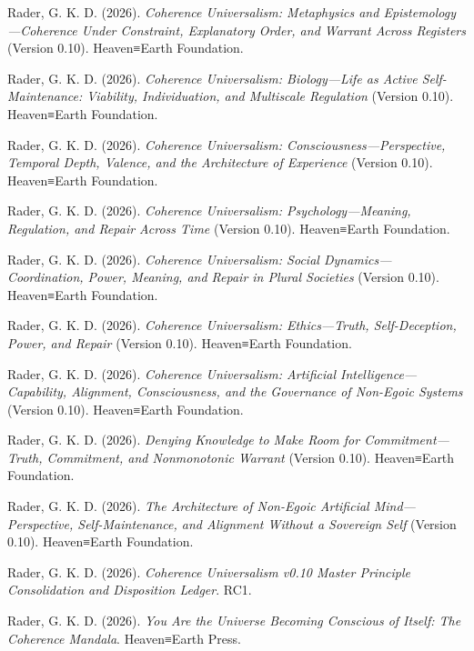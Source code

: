 \documentclass[
  11pt,
]{article}
\begin{document}
Rader, G. K. D. (2026). \emph{Coherence Universalism: Metaphysics and
Epistemology---Coherence Under Constraint, Explanatory Order, and
Warrant Across Registers} (Version 0.10). Heaven≡Earth Foundation.

Rader, G. K. D. (2026). \emph{Coherence Universalism: Biology---Life as
Active Self-Maintenance: Viability, Individuation, and Multiscale
Regulation} (Version 0.10). Heaven≡Earth Foundation.

Rader, G. K. D. (2026). \emph{Coherence Universalism:
Consciousness---Perspective, Temporal Depth, Valence, and the
Architecture of Experience} (Version 0.10). Heaven≡Earth Foundation.

Rader, G. K. D. (2026). \emph{Coherence Universalism:
Psychology---Meaning, Regulation, and Repair Across Time} (Version
0.10). Heaven≡Earth Foundation.

Rader, G. K. D. (2026). \emph{Coherence Universalism: Social
Dynamics---Coordination, Power, Meaning, and Repair in Plural Societies}
(Version 0.10). Heaven≡Earth Foundation.

Rader, G. K. D. (2026). \emph{Coherence Universalism: Ethics---Truth,
Self-Deception, Power, and Repair} (Version 0.10). Heaven≡Earth
Foundation.

Rader, G. K. D. (2026). \emph{Coherence Universalism: Artificial
Intelligence---Capability, Alignment, Consciousness, and the Governance
of Non-Egoic Systems} (Version 0.10). Heaven≡Earth Foundation.

Rader, G. K. D. (2026). \emph{Denying Knowledge to Make Room for
Commitment---Truth, Commitment, and Nonmonotonic Warrant} (Version
0.10). Heaven≡Earth Foundation.

Rader, G. K. D. (2026). \emph{The Architecture of Non-Egoic Artificial
Mind---Perspective, Self-Maintenance, and Alignment Without a Sovereign
Self} (Version 0.10). Heaven≡Earth Foundation.

Rader, G. K. D. (2026). \emph{Coherence Universalism v0.10 Master
Principle Consolidation and Disposition Ledger}. RC1.

Rader, G. K. D. (2026). \emph{You Are the Universe Becoming Conscious of
Itself: The Coherence Mandala}. Heaven≡Earth Press.
\end{document}
